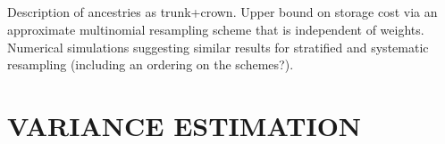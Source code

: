 \documentclass{article}
\begin{document}
\subsection*{\cite{jacob2015}}
Description of ancestries as trunk+crown. Upper bound on storage cost via an approximate multinomial resampling scheme that is independent of weights. Numerical simulations suggesting similar results for stratified and systematic resampling (including an ordering on the schemes?). 

\subsection*{\cite{koskela2018}}


%
\section*{VARIANCE ESTIMATION}

\subsection*{\cite{chan2013}}


\subsection*{\cite{lee2018}}


\subsection*{\cite{olsson2019}}


%
\end{document}
